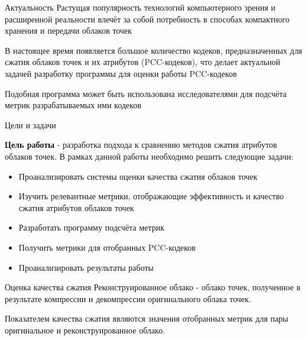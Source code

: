 \documentclass[aspectratio=169]{beamer}
\begin{document}
  \begin{frame}{Актуальность}
    Растущая популярность технологий компьютерного зрения и расширенной
    реальности влечёт за собой потребность в способах компактного хранения и
    передачи облаков точек

    В настоящее время появляется большое количество кодеков, предназначенных для
    сжатия облаков точек и их атрибутов (PCC-кодеков), что делает актуальной
    задачей разработку программы для оценки работы PCC-кодеков

    Подобная программа может быть использована исследователями для подсчёта
    метрик разрабатываемых ими кодеков
  \end{frame}

  \begin{frame}{Цели и задачи}

  \textbf{Цель работы} - разработка подхода к сравнению методов сжатия атрибутов
  облаков точек. В рамках данной работы необходимо решить следующие задачи:

  \begin{itemize}
      \item Проанализировать системы оценки качества сжатия облаков точек
      \item Изучить релевантные метрики, отображающие эффективность и качество
      сжатия атрибутов облаков точек
      \item Разработать программу подсчёта метрик
      \item Получить метрики для отобранных PCC-кодеков
      \item Проанализировать результаты работы
  \end{itemize}

  \end{frame}

  \begin{frame}{Оценка качества сжатия}
    Реконструированное облако - облако точек, полученное в результате компрессии
    и декомпрессии оригинального облака точек.

    Показателем качества сжатия являются значения отобранных метрик для пары
    оригинальное и реконструированное облако.
  \end{frame}
\end{document}

